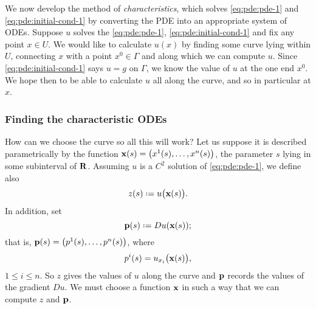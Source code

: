 We now develop the method of \emph{characteristics}, which solves
\eqref{eq:pde:pde-1} and \eqref{eq:pde:initial-cond-1} by converting the
PDE into an appropriate system of ODEs. Suppose \(u\) solves the
\eqref{eq:pde:pde-1}, \eqref{eq:pde:initial-cond-1} and fix any point
\(x\in U\). We would like to calculate \(u(x)\) by finding some curve lying
within \(U\), connecting \(x\) with a point \(x^0\in\Gamma\) and along
which we can compute \(u\). Since \eqref{eq:pde:initial-cond-1} says \(u=g\) on
\(\Gamma\), we know the value of \(u\) at the one end \(x^0\). We hope then
to be able to calculate \(u\) all along the curve, and so in particular at
\(x\).
\subsubsection{Finding the characteristic ODEs}
How can we choose the curve so all this will work? Let us suppose it is
described parametrically by the function
\(\mathbf{x}(s)=\bigl(x^1(s),\dotsc,x^n(s)\bigr)\), the parameter \(s\) lying in
some subinterval of \(\mathbf{R}\). Assuming \(u\) is a \(C^2\) solution of
\eqref{eq:pde:pde-1}, we define also
\[
  z(s)\defeq u\bigl(\bfx(s)\bigr).
\]
In addition, set
\[
  \bfp(s)\defeq Du(\bfx(s));
\]
that is, \(\mathbf{p}(s)=\bigl(p^1(s),\dotsc,p^n(s)\bigr)\), where
\begin{equation}
  \label{eq:pde:char-curve-p-i}
  p^i(s)=u_{x_i}\bigl(\mathbf{x}(s)\bigr),
\end{equation}
\(1\leq i\leq n\). So \(z\) gives the values of \(u\) along the curve and
\(\mathbf{p}\) records the values of the gradient \(Du\). We must choose a
function \(\mathbf{x}\) in such a way that we can compute \(z\) and \(\mathbf{p}\).

